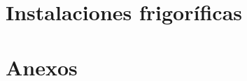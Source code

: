\documentclass[11pt,a4paper]{book}
\begin{document}
	
	
	

	\raggedbottom
	
	\tableofcontents
	
	\vfill

	\newpage 


	\part{Instalaciones frigoríficas}
	
	


%	

%	

%	

%	

%	

%	

	\appendix
	\part{Anexos}
	

	\captionsetup{font=scriptsize}
	
	
\end{document}
